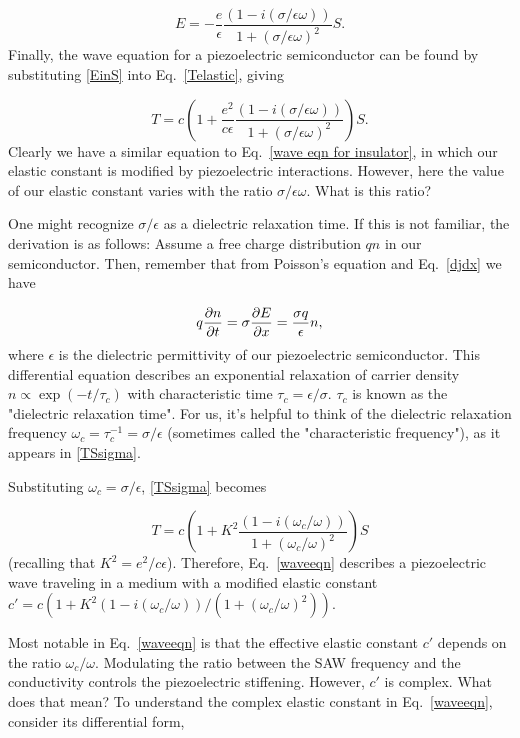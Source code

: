 \documentclass[double,12pt,1in,seploa]{beavtex}
\begin{document}
\begin{equation}
    E = -\frac{e}{\epsilon}\frac{(1-i(\sigma/\epsilon\omega))}{1+(\sigma/\epsilon\omega)^2}S. \label{EinS}
\end{equation}
Finally, the wave equation for a piezoelectric semiconductor can be found by substituting \ref{EinS} into Eq.\ \ref{Telastic}, giving

\begin{equation}
    T = c(1 + \frac{e^2}{c\epsilon}\frac{(1-i(\sigma/\epsilon\omega))}{1+(\sigma/\epsilon\omega)^2})S. \label{TSsigma}
\end{equation}
Clearly we have a similar equation to Eq.\ \ref{wave eqn for insulator}, in which our elastic constant is modified by piezoelectric interactions. However, here the value of our elastic constant varies with the ratio $\sigma/\epsilon\omega$. What is this ratio?

One might recognize $\sigma/\epsilon$ as a dielectric relaxation time. If this is not familiar, the derivation is as follows: Assume a free charge distribution $qn$ in our semiconductor. Then, remember that from Poisson's equation and Eq.\ \ref{djdx} we have

\begin{equation}
    q\pdv{n}{t} = \sigma\pdv{E}{x} = \frac{\sigma q}{\epsilon}n, 
\end{equation}
where $\epsilon$ is the dielectric permittivity of our piezoelectric semiconductor. This differential equation describes an exponential relaxation of carrier density $n \propto \exp(-t/\tau_c)$ with characteristic time $\tau_c = \epsilon/\sigma$. $\tau_c$ is known as the "dielectric relaxation time". For us, it's helpful to think of the dielectric relaxation frequency $\omega_c = \tau_c^{-1} = \sigma/\epsilon$ (sometimes called the "characteristic frequency"), as it appears in \ref{TSsigma}. 

Substituting $\omega_c = \sigma/\epsilon$, \ref{TSsigma} becomes

\begin{equation}
    T = c(1 + K^2\frac{(1-i(\omega_c/\omega))}{1+(\omega_c/\omega)^2})S \label{waveeqn}
\end{equation}
(recalling that $K^2 = e^2/c\epsilon$). Therefore, Eq.\ \ref{waveeqn} describes a piezoelectric wave traveling in a medium with a modified elastic constant $c' = c(1 + K^2(1-i(\omega_c/\omega))/(1+(\omega_c/\omega)^2))$.

Most notable in Eq.\ \ref{waveeqn} is that the effective elastic constant $c'$ depends on the ratio $\omega_c/\omega$. Modulating the ratio between the SAW frequency and the conductivity controls the piezoelectric stiffening. However, $c'$ is complex. What does that mean? To understand the complex elastic constant in Eq.\ \ref{waveeqn}, consider its differential form,
\end{document}
